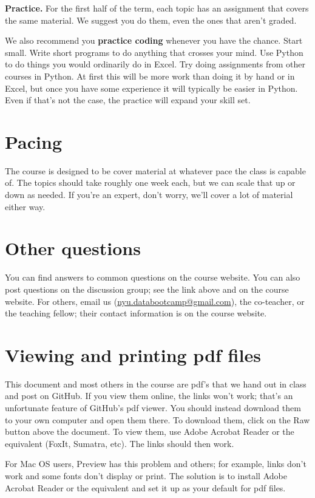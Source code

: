 \documentclass[11pt]{article}
\begin{document}
{\bf Practice.\/}
For the first half of the term, each topic has an assignment that covers the same material.
We suggest you do them, even the ones that aren't graded.

We also recommend you {\bf practice coding\/} whenever you have the chance.
Start small. Write short programs to do anything that crosses your mind.
Use Python to do things you would ordinarily do in Excel.
Try doing assignments from other courses in Python.
At first this will be more work than doing it by hand or in Excel,
but once you have some experience it will typically be easier in Python.
Even if that's not the case, the practice will expand your skill set.


\section*{Pacing}

The course is designed to be cover material at whatever pace the class is capable of.
The topics should take roughly one week each, but we can scale that up or down as needed.
If you're an expert, don't worry, we'll cover a lot of material either way.


\section*{Other questions}

You can find answers to common questions on the course website.
You can also post questions on the discussion group;
see the link above and on the course website.
For others, email us (\href{mailto:nyu.databootcamp@gmail.com}{nyu.databootcamp@gmail.com}),
the co-teacher, or the teaching fellow; their contact information is on the course website.


\section*{Viewing and printing pdf files}

This document and most others in the course are pdf's that we hand out in class and post on GitHub.
If you view them online, the links won't work; that's an unfortunate feature of GitHub's pdf viewer.
You should instead download them to your own computer and open them there.
To download them,
click on the Raw button above the document.
To view them, use Adobe Acrobat Reader or the equivalent (FoxIt, Sumatra, etc).
The links should then work.

For Mac OS users, Preview has this problem and others; for example,
links don't work and some fonts don't display or print.
The solution is to install Adobe Acrobat Reader or the equivalent
and set it up as your default for pdf files.
\end{document}
